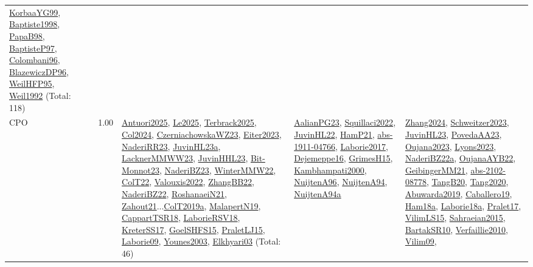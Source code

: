 {\begin{longtable}{p{3cm}r>{\raggedright\arraybackslash}p{6cm}>{\raggedright\arraybackslash}p{6cm}>{\raggedright\arraybackslash}p{8cm}}
\hyperref[detail:KorbaaYG99]{KorbaaYG99}, \hyperref[detail:Baptiste1998]{Baptiste1998}, \hyperref[detail:PapaB98]{PapaB98}, \hyperref[detail:BaptisteP97]{BaptisteP97}, \hyperref[detail:Colombani96]{Colombani96}, \hyperref[detail:BlazewiczDP96]{BlazewiczDP96}, \hyperref[detail:WeilHFP95]{WeilHFP95}, \hyperref[detail:Weil1992]{Weil1992} (Total: 118)\\
\index{CPO}\index{CPSystems!CPO}CPO &  1.00 & \hyperref[detail:Antuori2025]{Antuori2025}, \hyperref[detail:Le2025]{Le2025}, \hyperref[detail:Terbrack2025]{Terbrack2025}, \hyperref[detail:Col2024]{Col2024}, \hyperref[detail:CzerniachowskaWZ23]{CzerniachowskaWZ23}, \hyperref[detail:Eiter2023]{Eiter2023}, \hyperref[detail:NaderiRR23]{NaderiRR23}, \hyperref[detail:JuvinHL23a]{JuvinHL23a}, \hyperref[detail:LacknerMMWW23]{LacknerMMWW23}, \hyperref[detail:JuvinHHL23]{JuvinHHL23}, \hyperref[detail:Bit-Monnot23]{Bit-Monnot23}, \hyperref[detail:NaderiBZ23]{NaderiBZ23}, \hyperref[detail:WinterMMW22]{WinterMMW22}, \hyperref[detail:ColT22]{ColT22}, \hyperref[detail:Valouxis2022]{Valouxis2022}, \hyperref[detail:ZhangBB22]{ZhangBB22}, \hyperref[detail:NaderiBZ22]{NaderiBZ22}, \hyperref[detail:RoshanaeiN21]{RoshanaeiN21}, \hyperref[detail:Zahout21]{Zahout21}...\hyperref[detail:ColT2019a]{ColT2019a}, \hyperref[detail:MalapertN19]{MalapertN19}, \hyperref[detail:CappartTSR18]{CappartTSR18}, \hyperref[detail:LaborieRSV18]{LaborieRSV18}, \hyperref[detail:KreterSS17]{KreterSS17}, \hyperref[detail:GoelSHFS15]{GoelSHFS15}, \hyperref[detail:PraletLJ15]{PraletLJ15}, \hyperref[detail:Laborie09]{Laborie09}, \hyperref[detail:Younes2003]{Younes2003}, \hyperref[detail:Elkhyari03]{Elkhyari03} (Total: 46) & \hyperref[detail:AalianPG23]{AalianPG23}, \hyperref[detail:Squillaci2022]{Squillaci2022}, \hyperref[detail:JuvinHL22]{JuvinHL22}, \hyperref[detail:HamP21]{HamP21}, \hyperref[detail:abs-1911-04766]{abs-1911-04766}, \hyperref[detail:Laborie2017]{Laborie2017}, \hyperref[detail:Dejemeppe16]{Dejemeppe16}, \hyperref[detail:GrimesH15]{GrimesH15}, \hyperref[detail:Kambhampati2000]{Kambhampati2000}, \hyperref[detail:NuijtenA96]{NuijtenA96}, \hyperref[detail:NuijtenA94]{NuijtenA94}, \hyperref[detail:NuijtenA94a]{NuijtenA94a} & \hyperref[detail:Zhang2024]{Zhang2024}, \hyperref[detail:Schweitzer2023]{Schweitzer2023}, \hyperref[detail:JuvinHL23]{JuvinHL23}, \hyperref[detail:PovedaAA23]{PovedaAA23}, \hyperref[detail:Oujana2023]{Oujana2023}, \hyperref[detail:Lyons2023]{Lyons2023}, \hyperref[detail:NaderiBZ22a]{NaderiBZ22a}, \hyperref[detail:OujanaAYB22]{OujanaAYB22}, \hyperref[detail:GeibingerMM21]{GeibingerMM21}, \hyperref[detail:abs-2102-08778]{abs-2102-08778}, \hyperref[detail:TangB20]{TangB20}, \hyperref[detail:Tang2020]{Tang2020}, \hyperref[detail:Abuwarda2019]{Abuwarda2019}, \hyperref[detail:Caballero19]{Caballero19}, \hyperref[detail:Ham18a]{Ham18a}, \hyperref[detail:Laborie18a]{Laborie18a}, \hyperref[detail:Pralet17]{Pralet17}, \hyperref[detail:VilimLS15]{VilimLS15}, \hyperref[detail:Sahraeian2015]{Sahraeian2015}, \hyperref[detail:BartakSR10]{BartakSR10}, \hyperref[detail:Verfaillie2010]{Verfaillie2010}, \hyperref[detail:Vilim09]{Vilim09}, 
\end{longtable}}

